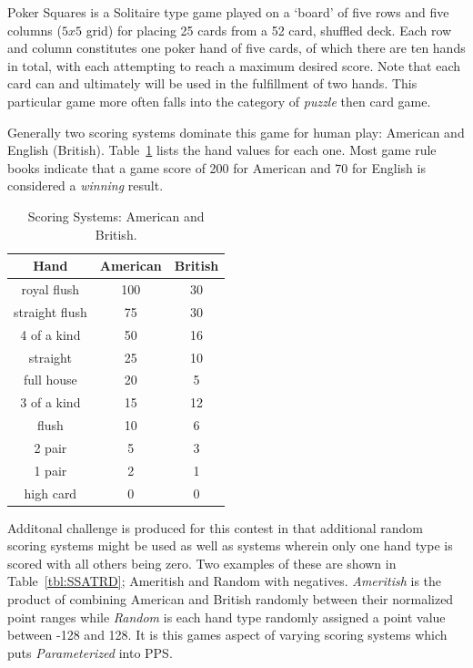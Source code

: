 \documentclass[letterpaper]{article}
\begin{document}
Poker Squares is a Solitaire type game played on a `board' of five rows and five columns ($5 x 5$ grid) for placing 25 cards from a 52 card, shuffled deck. Each row and column constitutes one poker hand of five cards, of which there are ten hands in total, with each attempting to reach a maximum desired score. Note that each card can and ultimately will be used in the fulfillment of two hands. This particular game more often falls into the category of  \emph{puzzle} then card game.

Generally two scoring systems dominate this game for human play: American and English (British). Table~\ref{tbl:SSAMBR} lists the hand values for each one. Most game rule books indicate that a game score of 200 for American and 70 for English is considered a \emph{winning} result.

\begin{table}
\caption{Scoring Systems: American and British.}
\label{tbl:SSAMBR}
\centering
\begin{tabular}{c c c}
\hline
Hand & American & British \\
\hline
royal flush & 100 & 30 \\
straight flush & 75 & 30 \\
4 of a kind & 50 & 16 \\
straight & 25 & 10 \\
full house & 20 & 5 \\
3 of a kind & 15 & 12 \\
flush & 10 & 6 \\
2 pair & 5 & 3 \\
1 pair & 2 & 1 \\
high card & 0 & 0 \\
\hline
\end{tabular}
\end{table}

Additonal challenge is produced for this contest in that additional random scoring systems might be used as well as systems wherein only one hand type is scored with all others being zero. Two examples of these are shown in Table~\ref{tbl:SSATRD}; Ameritish and Random with negatives. \emph{Ameritish} is the product of combining American and British randomly between their normalized point ranges while \emph{Random} is each hand type randomly assigned a point value between -128 and 128. It is this games aspect of varying scoring systems which puts \emph{Parameterized} into PPS.
\end{document}
